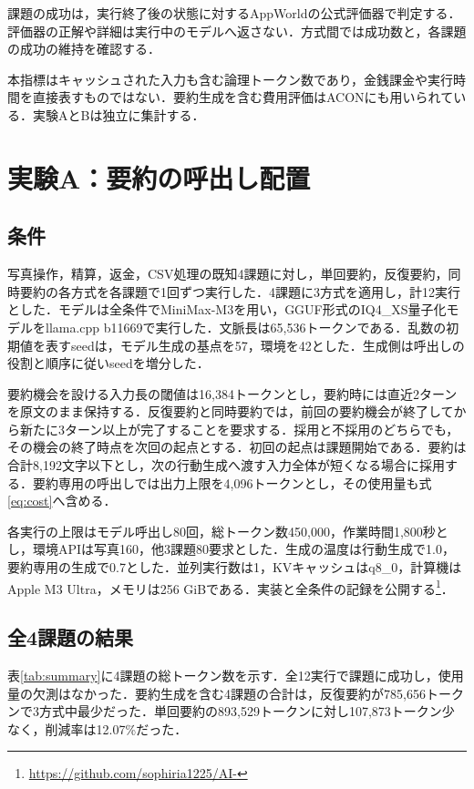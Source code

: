 \documentclass[letter]{ieicej}
\begin{document}
課題の成功は，実行終了後の状態に対するAppWorld\cite{trivedi2024appworld}の公式評価器で判定する．評価器の正解や詳細は実行中のモデルへ返さない．方式間では成功数と，各課題の成功の維持を確認する．

本指標はキャッシュされた入力も含む論理トークン数であり，金銭課金や実行時間を直接表すものではない\cite{xu2026tokenpilot}．要約生成を含む費用評価はACON\cite{kang2026acon}にも用いられている．実験AとBは独立に集計する．

\section{実験A：要約の呼出し配置}

\subsection{条件}

写真操作，精算，返金，CSV処理の既知4課題に対し，単回要約，反復要約，同時要約の各方式を各課題で1回ずつ実行した．4課題に3方式を適用し，計12実行とした．モデルは全条件でMiniMax-M3を用い，GGUF形式のIQ4\_XS量子化モデルをllama.cpp b11669で実行した．文脈長は65,536トークンである．乱数の初期値を表すseedは，モデル生成の基点を57，環境を42とした．生成側は呼出しの役割と順序に従いseedを増分した．

要約機会を設ける入力長の閾値は16,384トークンとし，要約時には直近2ターンを原文のまま保持する．反復要約と同時要約では，前回の要約機会が終了してから新たに3ターン以上が完了することを要求する．採用と不採用のどちらでも，その機会の終了時点を次回の起点とする．初回の起点は課題開始である．要約は合計8,192文字以下とし，次の行動生成へ渡す入力全体が短くなる場合に採用する．要約専用の呼出しでは出力上限を4,096トークンとし，その使用量も式\eqref{eq:cost}へ含める．

各実行の上限はモデル呼出し80回，総トークン数450,000，作業時間1,800秒とし，環境APIは写真160，他3課題80要求とした．生成の温度は行動生成で1.0，要約専用の生成で0.7とした．並列実行数は1，KVキャッシュはq8\_0，計算機はApple M3 Ultra，メモリは256 GiBである．実装と全条件の記録を公開する\footnote{\url{https://github.com/sophiria1225/AI-}}．

\subsection{全4課題の結果}

表\ref{tab:summary}に4課題の総トークン数を示す．全12実行で課題に成功し，使用量の欠測はなかった．要約生成を含む4課題の合計は，反復要約が785,656トークンで3方式中最少だった．単回要約の893,529トークンに対し107,873トークン少なく，削減率は12.07\%だった．
\end{document}

